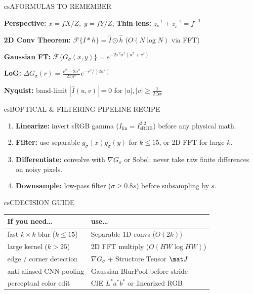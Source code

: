 \documentclass[../../../../master.tex]{subfiles}
\begin{document}
\csnextpage

\begin{cscolumns}
\begin{cscard}{csA}{FORMULAS TO REMEMBER}
  \begin{csbul}
    \item \textbf{Perspective:} $x=fX/Z,\; y=fY/Z$; \textbf{Thin lens:} $z_o^{-1}+z_i^{-1}=f^{-1}$
    \item \textbf{2D Conv Theorem:} $\mathcal{F}\{I*h\}=\hat I\odot\hat h$ ($O(N\log N)$ via FFT)
    \item \textbf{Gaussian FT:} $\mathcal{F}\{G_\sigma(x,y)\} = e^{-2\pi^2\sigma^2(u^2+v^2)}$
    \item \textbf{LoG:} $\Delta G_\sigma(r)=\frac{r^2-2\sigma^2}{2\pi\sigma^6}e^{-r^2/(2\sigma^2)}$
    \item \textbf{Nyquist:} band-limit $|\hat I(u,v)|=0$ for $|u|,|v|\ge \frac{1}{2\Delta x}$
  \end{csbul}
\end{cscard}

\begin{cscard}{csB}{OPTICAL \& FILTERING PIPELINE RECIPE}
  \begin{enumerate}[leftmargin=1.2em, itemsep=1pt, topsep=1pt, parsep=0pt]
    \item \textbf{Linearize:} invert sRGB gamma ($I_{\mathrm{lin}}=I_{\mathrm{sRGB}}^{2.2}$) before any physical math.
    \item \textbf{Filter:} use separable $g_\sigma(x)g_\sigma(y)$ for $k\le 15$, or 2D FFT for large $k$.
    \item \textbf{Differentiate:} convolve with $\nabla G_\sigma$ or Sobel; never take raw finite differences on noisy pixels.
    \item \textbf{Downsample:} low-pass filter ($\sigma\ge 0.8s$) before subsampling by $s$.
  \end{enumerate}
\end{cscard}
\columnbreak

\begin{cscard}{csC}{DECISION GUIDE}
  \renewcommand{\arraystretch}{1.18}\small
  \begin{tabular}{@{}>{\raggedright\arraybackslash}p{3.1cm}>{\raggedright\arraybackslash}p{4.6cm}@{}}
    \textbf{If you need\ldots} & \textbf{use\ldots}\\ \hline
    fast $k\times k$ blur ($k\le 15$) & Separable 1D convs ($O(2k)$)\\
    large kernel ($k > 25$) & 2D FFT multiply ($O(HW\log HW)$)\\
    edge / corner detection & $\nabla G_\sigma$ + Structure Tensor $\mat J$\\
    anti-aliased CNN pooling & Gaussian BlurPool before stride\\
    perceptual color edit & CIE $L^*a^*b^*$ or linearized RGB\\
  \end{tabular}
\end{cscard}


\end{cscolumns}
\end{document}
